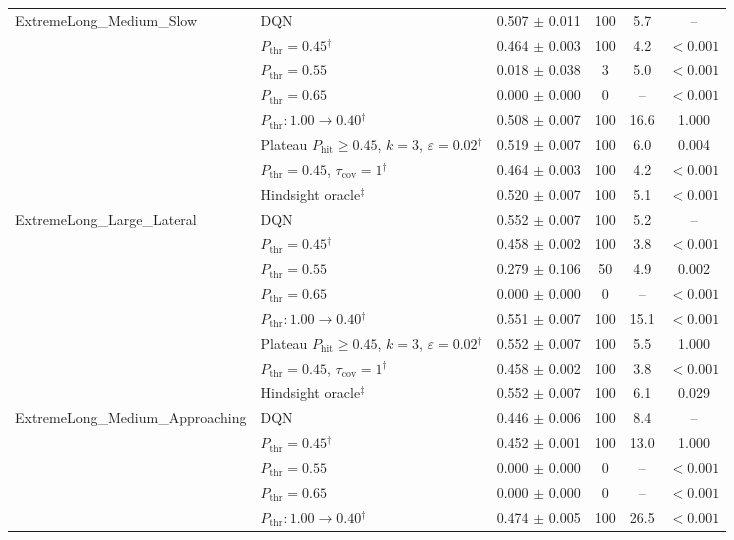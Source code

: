 \begin{table}[htbp]
\begin{tabular}{llcccc}
\midrule
\multirow{8}{*}{ExtremeLong\_Medium\_Slow} & DQN & 0.507 $\pm$ 0.011 & 100 & 5.7 & -- \\
 & $P_{\mathrm{thr}}=0.45$$^{\dagger}$ & 0.464 $\pm$ 0.003 & 100 & 4.2 & $<0.001$ \\
 & $P_{\mathrm{thr}}=0.55$ & 0.018 $\pm$ 0.038 & 3 & 5.0 & $<0.001$ \\
 & $P_{\mathrm{thr}}=0.65$ & 0.000 $\pm$ 0.000 & 0 & -- & $<0.001$ \\
 & $P_{\mathrm{thr}}: 1.00 \to 0.40$$^{\dagger}$ & 0.508 $\pm$ 0.007 & 100 & 16.6 & 1.000 \\
 & Plateau $P_{\mathrm{hit}}\geq0.45$, $k=3$, $\varepsilon=0.02$$^{\dagger}$ & 0.519 $\pm$ 0.007 & 100 & 6.0 & 0.004 \\
 & $P_{\mathrm{thr}}=0.45$, $\tau_{\mathrm{cov}}=1$$^{\dagger}$ & 0.464 $\pm$ 0.003 & 100 & 4.2 & $<0.001$ \\
 & Hindsight oracle$^{\ddagger}$ & 0.520 $\pm$ 0.007 & 100 & 5.1 & $<0.001$ \\
\midrule
\multirow{8}{*}{ExtremeLong\_Large\_Lateral} & DQN & 0.552 $\pm$ 0.007 & 100 & 5.2 & -- \\
 & $P_{\mathrm{thr}}=0.45$$^{\dagger}$ & 0.458 $\pm$ 0.002 & 100 & 3.8 & $<0.001$ \\
 & $P_{\mathrm{thr}}=0.55$ & 0.279 $\pm$ 0.106 & 50 & 4.9 & 0.002 \\
 & $P_{\mathrm{thr}}=0.65$ & 0.000 $\pm$ 0.000 & 0 & -- & $<0.001$ \\
 & $P_{\mathrm{thr}}: 1.00 \to 0.40$$^{\dagger}$ & 0.551 $\pm$ 0.007 & 100 & 15.1 & $<0.001$ \\
 & Plateau $P_{\mathrm{hit}}\geq0.45$, $k=3$, $\varepsilon=0.02$$^{\dagger}$ & 0.552 $\pm$ 0.007 & 100 & 5.5 & 1.000 \\
 & $P_{\mathrm{thr}}=0.45$, $\tau_{\mathrm{cov}}=1$$^{\dagger}$ & 0.458 $\pm$ 0.002 & 100 & 3.8 & $<0.001$ \\
 & Hindsight oracle$^{\ddagger}$ & 0.552 $\pm$ 0.007 & 100 & 6.1 & 0.029 \\
\midrule
\multirow{8}{*}{ExtremeLong\_Medium\_Approaching} & DQN & 0.446 $\pm$ 0.006 & 100 & 8.4 & -- \\
 & $P_{\mathrm{thr}}=0.45$$^{\dagger}$ & 0.452 $\pm$ 0.001 & 100 & 13.0 & 1.000 \\
 & $P_{\mathrm{thr}}=0.55$ & 0.000 $\pm$ 0.000 & 0 & -- & $<0.001$ \\
 & $P_{\mathrm{thr}}=0.65$ & 0.000 $\pm$ 0.000 & 0 & -- & $<0.001$ \\
 & $P_{\mathrm{thr}}: 1.00 \to 0.40$$^{\dagger}$ & 0.474 $\pm$ 0.005 & 100 & 26.5 & $<0.001$ \\

\end{tabular}
\end{table}
